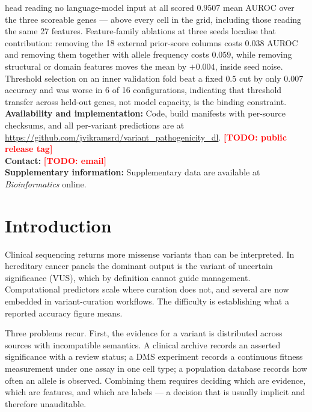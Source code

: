 \documentclass{bioinfo}
\makeatletter
\newcommand{\bi@front}{}
\newcommand{\bi@abstract}{}
\let\bi@maketitle\maketitle
\renewcommand{\maketitle}{%
    \bi@maketitle
    {\centering\small\bi@front\par}%
    \begin{quote}\small\bi@abstract\end{quote}}
\newcommand{\todo}[1]{\textcolor{red}{\textbf{[TODO: #1]}}}
\makeatother
\begin{document}
{head reading no language-model input at all scored $0.9507$ mean AUROC over the
three scoreable genes --- above every cell in the grid, including those reading
the same 27 features. Feature-family ablations at three seeds localise that
contribution: removing the 18 external prior-score columns costs $0.038$ AUROC
and removing them together with allele frequency costs $0.059$, while removing
structural or domain features moves the mean by $+0.004$, inside seed noise.
Threshold selection on an inner validation fold beat a fixed $0.5$ cut by only
$0.007$ accuracy and was worse in 6 of 16 configurations, indicating that
threshold transfer across held-out genes, not model capacity, is the binding
constraint.
\\
\textbf{Availability and implementation:}
Code, build manifests with per-source checksums, and all per-variant
predictions are at
\url{https://github.com/jvikramsrd/variant_pathogenicity_dl}.
\todo{public release tag}
\\
\textbf{Contact:} \todo{email}
\\
\textbf{Supplementary information:} Supplementary data are available at
\textit{Bioinformatics} online.}

\maketitle

\section{Introduction}

Clinical sequencing returns more missense variants than can be interpreted. In
hereditary cancer panels the dominant output is the variant of uncertain
significance (VUS), which by definition cannot guide management. Computational
predictors scale where curation does not, and several are now embedded in
variant-curation workflows. The difficulty is establishing what a reported
accuracy figure means.

Three problems recur. First, the evidence for a variant is distributed across
sources with incompatible semantics. A clinical archive records an asserted
significance with a review status; a DMS experiment records a continuous
fitness measurement under one assay in one cell type; a population database
records how often an allele is observed. Combining them requires deciding which
are evidence, which are features, and which are labels --- a decision that is
usually implicit and therefore unauditable.
\end{document}
